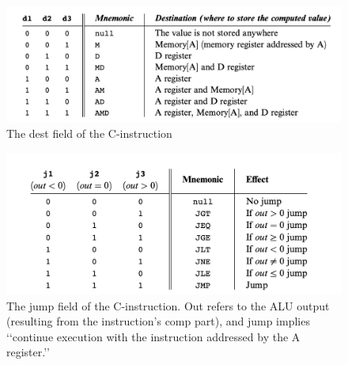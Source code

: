 \documentclass[11pt]{article}
\begin{document}
\begin{figure}[h!]
	\centering
	\includegraphics[scale=0.5]{pictures/dst.png}
	\caption{The dest field of the C-instruction}
	\label{fig:dst}
\end{figure}

\begin{figure}[h!]
	\centering
	\includegraphics[scale=0.5]{pictures/jmp.png}
	\caption{The jump field of the C-instruction. Out refers to the ALU output (resulting from
		the instruction’s comp part), and jump implies ‘‘continue execution with the instruction
		addressed by the A register.’’}
	\label{fig:jmp}
\end{figure}
\end{document}
